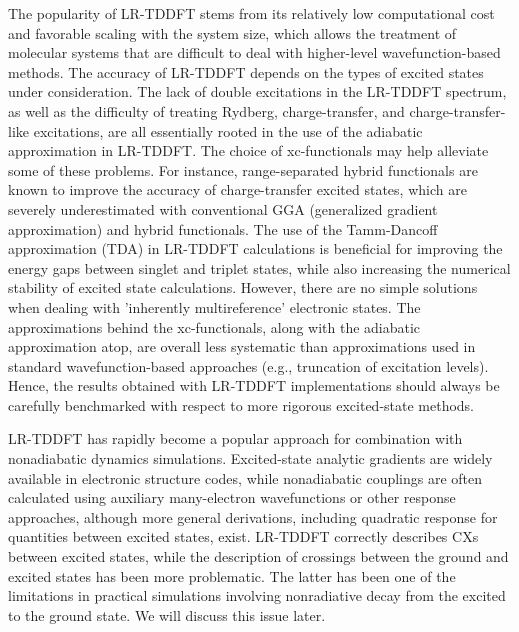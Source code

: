 \documentclass[9pt,bestpractices,pubversion]{livecoms}
\begin{document}
The popularity of LR-TDDFT stems from its relatively low computational cost and favorable scaling with the system size, which allows the treatment of molecular systems that are difficult to deal with higher-level wavefunction-based methods. The accuracy of LR-TDDFT depends on the types of excited states under consideration. The lack of double excitations in the LR-TDDFT spectrum,\cite{elliott2011perspectives,levine06} as well as the difficulty of treating Rydberg, charge-transfer,\cite{dreuw2003long} and charge-transfer-like excitations,\cite{kuritz2011charge} are all essentially rooted in the use of the adiabatic approximation in LR-TDDFT.\cite{tddftcarsten} The choice of xc-functionals may help alleviate some of these problems. For instance, range-separated hybrid functionals are known to improve the accuracy of charge-transfer excited states,\cite{laurent2013td} which are severely underestimated with conventional GGA (generalized gradient approximation) and hybrid functionals. The use of the Tamm-Dancoff approximation (TDA) in LR-TDDFT calculations is beneficial\cite{hirata99} for improving the energy gaps between singlet and triplet states,\cite{peach2011influence} while also increasing the numerical stability of excited state calculations.\cite{oxirane_I,tapavicza08} However, there are no simple solutions when dealing with 'inherently multireference' electronic states. The approximations behind the xc-functionals, along with the adiabatic approximation atop, are overall less systematic than approximations used in standard wavefunction-based approaches (e.g., truncation of excitation levels). Hence, the results obtained with LR-TDDFT implementations should always be carefully benchmarked with respect to more rigorous excited-state methods.

LR-TDDFT has rapidly become a popular approach for combination with nonadiabatic dynamics simulations.\cite{curchod2013trajectory,barbatti2014surface} Excited-state analytic gradients are widely available in electronic structure codes, while nonadiabatic couplings are often calculated using auxiliary many-electron wavefunctions\cite{tapavicza07,tavernelli09b,Tavernelli2009,tavernelli2010nonadiabatic,curchod2013trajectory,mitric2008nonadiabatic} or other response approaches\cite{chernyak2000density,hu08,send_first-order_2010}, although more general derivations, including quadratic response for quantities between excited states, exist.\cite{li2014first,ou_first-order_2015,wang_nac-tddft_2021} LR-TDDFT correctly describes CXs between excited states, while the description of crossings between the ground and excited states has been more problematic.\cite{levine06,taylor2023description} The latter has been one of the limitations in practical simulations involving nonradiative decay from the excited to the ground state.\cite{barbatti2014surface} We will discuss this issue later.
\end{document}
